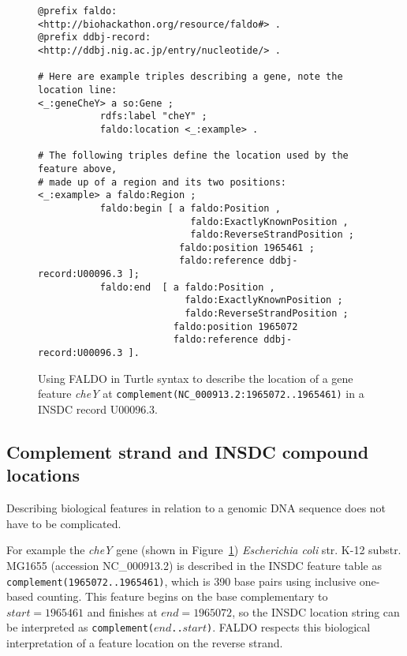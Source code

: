 %
\begin{figure}
\begin{shaded}
\small
\begin{verbatim} 
@prefix faldo:       <http://biohackathon.org/resource/faldo#> .
@prefix ddbj-record: <http://ddbj.nig.ac.jp/entry/nucleotide/> . 

# Here are example triples describing a gene, note the location line:
<_:geneCheY> a so:Gene ;
           rdfs:label "cheY" ;
           faldo:location <_:example> .

# The following triples define the location used by the feature above,
# made up of a region and its two positions:
<_:example> a faldo:Region ;
           faldo:begin [ a faldo:Position ,
                           faldo:ExactlyKnownPosition ,
                           faldo:ReverseStrandPosition ;
                         faldo:position 1965461 ;
                         faldo:reference ddbj-record:U00096.3 ];
           faldo:end  [ a faldo:Position ,
                          faldo:ExactlyKnownPosition ;
                          faldo:ReverseStrandPosition ;
                        faldo:position 1965072
                        faldo:reference ddbj-record:U00096.3 ].
\end{verbatim}
\end{shaded}
\caption{Using FALDO in Turtle\cite{TurtleFormatSpec} syntax to describe the location of a
gene feature \textit{cheY} at \texttt{complement(NC\_000913.2:1965072..1965461)} in a INSDC record U00096.3.}
\label{fig:insdcComplement}
\end{figure}


\subsection*{Complement strand and INSDC compound locations}

Describing biological features in relation to a genomic DNA sequence does not have to be complicated.

For example the \textit{cheY} gene (shown in Figure~\ref{fig:insdcComplement})
\textit{Escherichia coli} str. K-12 substr. MG1655 (accession NC\_000913.2)
is described in the INSDC feature table as \texttt{complement(1965072..1965461)},
which is 390 base pairs using inclusive one-based counting.
This feature begins on the base complementary to $start = 1965461$
and finishes at $end = 1965072$, so the INSDC location string
can be interpreted as \texttt{complement($end$..$start$)}.
FALDO respects this biological interpretation of a feature location
on the reverse strand.

